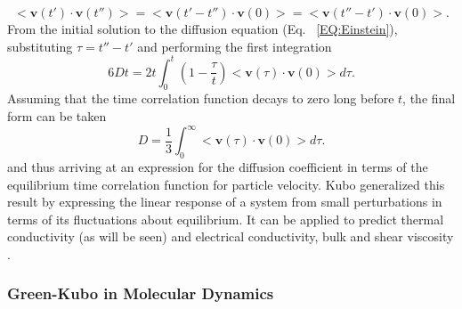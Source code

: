 %
\begin{equation}
<\bm{v}(t')\cdot\bm{v}(t'')>=<\bm{v}(t'-t'')\cdot\bm{v}(0)>=<\bm{v}(t''-t')\cdot\bm{v}(0)>.
\end{equation}
%
From the initial solution to the diffusion equation (Eq. ~\ref{EQ:Einstein}), substituting $\tau=t''-t'$ and performing the first integration
%
\begin{equation}
6Dt=2t\int_0^t\left(1-\frac{\tau}{t}\right)<\bm{v}(\tau)\cdot\bm{v}(0)>d\tau.
\end{equation}
%
Assuming that the time correlation function decays to zero long before $t$, the final form can be taken
%
\begin{equation}
D=\frac{1}{3}\int_0^{\infty}<\bm{v}(\tau)\cdot\bm{v}(0)>d\tau.
\end{equation}
%
and thus arriving at an expression for the diffusion coefficient in terms of the equilibrium time correlation function for particle velocity. Kubo generalized this result by expressing the linear response of a system from small perturbations in terms of its fluctuations about equilibrium. It can be applied to predict thermal conductivity (as will be seen)\cite{PhysRevB.61.2651} and electrical conductivity, \cite{zwanzig1965time} bulk and shear viscosity \cite{hoover1980lennard}.

\subsubsection {Green-Kubo in Molecular Dynamics}

